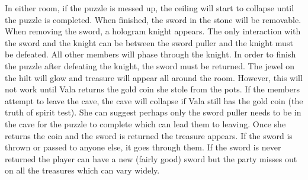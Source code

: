 In either room, if the puzzle is messed up, the ceiling will start to collapse until the puzzle is completed. When finished, the sword in the stone will be removable. When removing the sword, a hologram knight appears. The only interaction with the sword and the knight can be between the sword puller and the knight must be defeated. All other members will phase through the knight. In order to finish the puzzle after defeating the knight, the sword must be returned. The jewel on the hilt will glow and treasure will appear all around the room. However, this will not work until Vala returns the gold coin she stole from the pots. If the members attempt to leave the cave, the cave will collapse if Vala still has the gold coin (the truth of spirit test). She can suggest perhaps only the sword puller needs to be in the cave for the puzzle to complete which can lead them to leaving. Once she returns the coin and the sword is returned the treasure appears. If the sword is thrown or passed to anyone else, it goes through them. If the sword is never returned the player can have a new (fairly good) sword but the party misses out on all the treasures which can vary widely.
